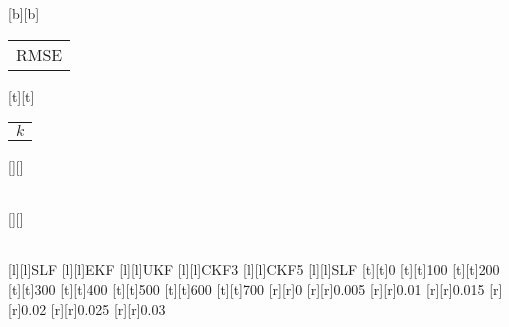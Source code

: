 %
%
[b][b]{\color[rgb]{0,0,0}\setlength{\tabcolsep}{0pt}\begin{tabular}{c}RMSE\end{tabular}}%
[t][t]{\color[rgb]{0,0,0}\setlength{\tabcolsep}{0pt}\begin{tabular}{c}$k$\end{tabular}}%
[][]{\color[rgb]{0,0,0}\setlength{\tabcolsep}{0pt}\begin{tabular}{c} \end{tabular}}%
[][]{\color[rgb]{0,0,0}\setlength{\tabcolsep}{0pt}\begin{tabular}{c} \end{tabular}}%
[l][l]{\color[rgb]{0,0,0}SLF}%
[l][l]{\color[rgb]{0,0,0}EKF}%
[l][l]{\color[rgb]{0,0,0}UKF}%
[l][l]{\color[rgb]{0,0,0}CKF3}%
[l][l]{\color[rgb]{0,0,0}CKF5}%
[l][l]{\color[rgb]{0,0,0}SLF}%
%
[t][t]{0}%
[t][t]{100}%
[t][t]{200}%
[t][t]{300}%
[t][t]{400}%
[t][t]{500}%
[t][t]{600}%
[t][t]{700}%
%
[r][r]{0}%
[r][r]{0.005}%
[r][r]{0.01}%
[r][r]{0.015}%
[r][r]{0.02}%
[r][r]{0.025}%
[r][r]{0.03}%
%
%
